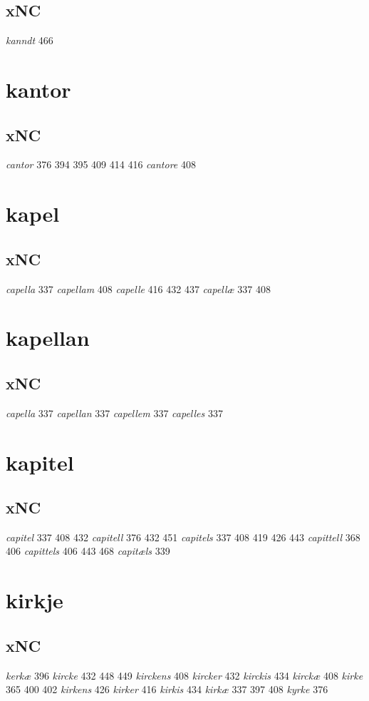 \documentclass[a4paper,twocolumn]{article}
\begin{document}
\subsection{xNC}
\label{sec:org681ce52}
\emph{kanndt} 466 
\section{kantor}
\label{sec:orgd974e50}
\subsection{xNC}
\label{sec:org78c2143}
\emph{cantor} 376 394 395 409 414 416 \emph{cantore} 408 
\section{kapel}
\label{sec:orgbe82b0c}
\subsection{xNC}
\label{sec:orgd30dc94}
\emph{capella} 337 \emph{capellam} 408 \emph{capelle} 416 432 437 \emph{capellæ} 337 408 
\section{kapellan}
\label{sec:org46bae10}
\subsection{xNC}
\label{sec:orgd435677}
\emph{capella} 337 \emph{capellan} 337 \emph{capellem} 337 \emph{capelles} 337 
\section{kapitel}
\label{sec:org8f79061}
\subsection{xNC}
\label{sec:orga3e950c}
\emph{capitel} 337 408 432 \emph{capitell} 376 432 451 \emph{capitels} 337 408 419 426 443 \emph{capittell} 368 406 \emph{capittels} 406 443 468 \emph{capitæls} 339 
\section{kirkje}
\label{sec:org4bbab41}
\subsection{xNC}
\label{sec:orgfeb1cf3}
\emph{kerkæ} 396 \emph{kircke} 432 448 449 \emph{kirckens} 408 \emph{kircker} 432 \emph{kirckis} 434 \emph{kirckæ} 408 \emph{kirke} 365 400 402 \emph{kirkens} 426 \emph{kirker} 416 \emph{kirkis} 434 \emph{kirkæ} 337 397 408 \emph{kyrke} 376 
\end{document}
